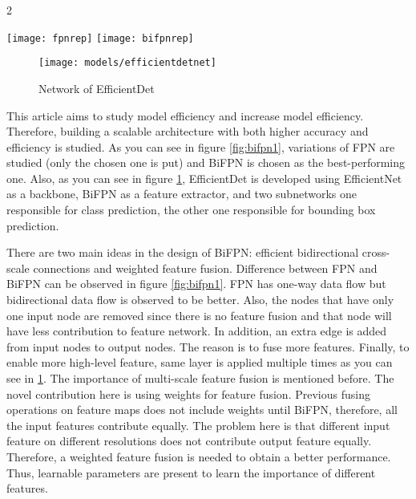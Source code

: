 \documentclass{article}
\begin{document}
\setlength{\parindent}{6ex}


\begin{multicols}{2}
    \begin{figure*}[ht!]
        \texttt{[image: fpnrep]}\hfill
        \texttt{[image: bifpnrep]}
        \caption{FPN (left) and BiFPN (right)}
        \label{fig:bifpn1}
    \end{figure*}
\end{multicols}

\begin{figure}
    \centering
    \texttt{[image: models/efficientdetnet]}
    \caption{Network of EfficientDet \cite{efficientdetcite}}
    \label{fig:efficientdetnet1}
\end{figure}

\indent

This article aims to study model efficiency and increase model 
efficiency. Therefore, building a scalable architecture with both higher 
accuracy and efficiency \cite{efficientdetcite} is studied. As you can see in figure 
\ref{fig:bifpn1}, variations of FPN are studied (only the chosen one is 
put) and BiFPN is chosen as the best-performing one. Also, as you can see 
in figure \ref{fig:efficientdetnet1}, EfficientDet is developed using 
EfficientNet as a backbone, BiFPN as a feature extractor, and two subnetworks 
one responsible for class prediction, the other one responsible for bounding 
box prediction. \par

There are two main ideas in the design of BiFPN: efficient bidirectional 
cross-scale connections and weighted feature fusion. Difference between 
FPN and BiFPN can be observed in figure \ref{fig:bifpn1}. FPN has one-way 
data flow but bidirectional data flow is observed to be better. Also, 
the nodes that have only one input node are removed since there is no 
feature fusion and that node will have less contribution to feature network. 
In addition, an extra edge is added from input nodes to output nodes. The 
reason is to fuse more features. Finally, to enable more high-level feature, 
same layer is applied multiple times as you can see in \ref{fig:efficientdetnet1}.
The importance of multi-scale feature fusion is mentioned before. The novel contribution 
here is using weights for feature fusion. Previous fusing operations 
on feature maps does not include weights until BiFPN, therefore, all the 
input features contribute equally. The problem here is that different 
input feature on different resolutions does not contribute output feature 
equally. Therefore, a weighted feature fusion is needed to obtain a better 
performance. Thus, learnable parameters are present to learn the importance 
of different features. \par
\end{document}
